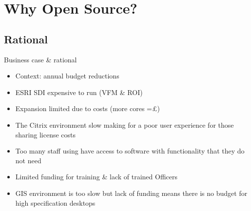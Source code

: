 \section{Why Open Source?}
\subsection{Rational}



\begin{frame}{Business case \& rational}
	\begin{block}{}
		\begin{itemize}
			\item Context: annual budget reductions
			\item ESRI SDI expensive to run (VFM \& ROI)
			\item Expansion limited due to costs (more cores =\pounds)
			\item The Citrix environment slow making for a poor user experience for those sharing license costs
			 
			\item Too many staff using have access to software with functionality that they do not need
			
			\item Limited funding for training \& lack of  trained Officers 
			
			\item GIS environment is too slow but lack of funding means there is no budget for high specification desktops
			
			
		\end{itemize}
	\end{block}
\end{frame}


